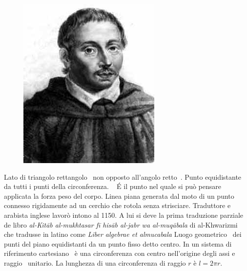 \begin{figure}
	\centering
	\includegraphics[width=0.7\linewidth]{Figure/C/Bonaventura_Cavalieri}
	\label{fig:bonaventuracavalieri}
\end{figure}
 Lato di triangolo rettangolo\pointsto~ non opposto all'angolo retto\pointsto~.
 Punto equidistante da tutti i punti della circonferenza. \pointsto~ \cite{UTET1969} 
 \'{E} il punto nel quale si può pensare applicata la forza peso del corpo.
 Linea piana generata dal moto di un punto connesso rigidamente ad un cerchio che rotola senza strisciare.
  Traduttore e arabista inglese lavorò intono al 1150. A lui si deve la prima traduzione parziale de libro \textit{al-Kitāb al-mukhtasar fī hisāb al-jabr wa al-muqābala} di al-Khwarizmi\pointsto~ che tradusse in latino come \textit{Liber algebrae et almucabala} \cite{Gheverghese2000} 
 Luogo geometrico\pointsto~ dei punti del piano equidistanti da un punto fisso detto centro. In un sistema di riferimento cartesiano\pointsto~ è una circonferenza con centro nell'origine degli assi e raggio\pointsto~ unitario. La lunghezza di una circonferenza di raggio $r$ è $l=2\pi r$.
